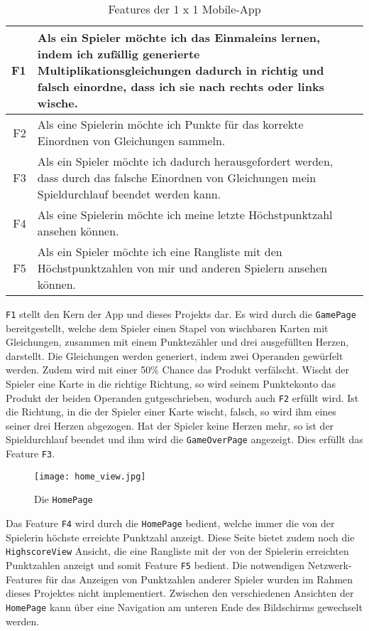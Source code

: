 \begin{table}[ht]
  \begin{tabu}{| >{\ttfamily} r | X |}
    \hline
    F1 & Als ein Spieler möchte ich das Einmaleins lernen, indem ich zufällig generierte Multiplikationsgleichungen dadurch in richtig und falsch einordne, dass ich sie nach rechts oder links wische.\\
    \hline
    F2 & Als eine Spielerin möchte ich Punkte für das korrekte Einordnen von Gleichungen sammeln.\\
    \hline
    F3 & Als ein Spieler möchte ich dadurch herausgefordert werden, dass durch das falsche Einordnen von Gleichungen mein Spieldurchlauf beendet werden kann.\\
    \hline
    F4 & Als eine Spielerin möchte ich meine letzte Höchstpunktzahl ansehen können.\\
    \hline
    F5 & Als ein Spieler möchte ich eine Rangliste mit den Höchstpunktzahlen von mir und anderen Spielern ansehen können.\\
    \hline
  \end{tabu}
  \caption{Features der 1 x 1 Mobile-App}\label{tab:features}
\end{table}

\texttt{F1} stellt den Kern der App und dieses Projekts dar.
Es wird durch die \texttt{GamePage} bereitgestellt, welche dem Spieler einen Stapel von wischbaren Karten mit Gleichungen, zusammen mit einem Punktezähler und drei ausgefüllten Herzen, darstellt.
Die Gleichungen werden generiert, indem zwei Operanden gewürfelt werden.
Zudem wird mit einer 50\% Chance das Produkt verfälscht.
Wischt der Spieler eine Karte in die richtige Richtung, so wird seinem Punktekonto das Produkt der beiden Operanden gutgeschrieben, wodurch auch \texttt{F2} erfüllt wird.
Ist die Richtung, in die der Spieler einer Karte wischt, falsch, so wird ihm eines seiner drei Herzen abgezogen.
Hat der Spieler keine Herzen mehr, so ist der Spieldurchlauf beendet und ihm wird die \texttt{GameOverPage} angezeigt.
Dies erfüllt das Feature \texttt{F3}.

\begin{wrapfigure}{l}{0.4\textwidth}
  \centering
  \texttt{[image: home\_view.jpg]}
  \caption{Die \texttt{HomePage}}
\end{wrapfigure}

Das Feature \texttt{F4} wird durch die \texttt{HomePage} bedient, welche immer die von der Spielerin höchste erreichte Punktzahl anzeigt.
Diese Seite bietet zudem noch die \texttt{HighscoreView} Ansicht, die eine Rangliste mit der von der Spielerin erreichten Punktzahlen anzeigt und somit Feature \texttt{F5} bedient.
Die notwendigen Netzwerk-Features für das Anzeigen von Punktzahlen anderer Spieler wurden im Rahmen dieses Projektes nicht implementiert.
Zwischen den verschiedenen Ansichten der \texttt{HomePage} kann über eine Navigation am unteren Ende des Bildschirms gewechselt werden.

